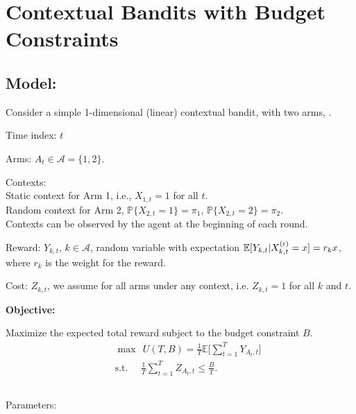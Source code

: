 \newpage

\section*{Contextual Bandits with Budget Constraints}


\subsection*{Model:}

Consider a simple 1-dimensional (linear) contextual bandit, with two arms, .

Time index: $t$

Arms: $A_t \in \mathcal{A} = \{1, 2\}$.

Contexts: \\
Static context for Arm 1, i.e., $X_{1,t} = 1$ for all $t$. \\
Random context for Arm 2, $\mathbb{P}\{X_{2,t} = 1\} = \pi_1$, $\mathbb{P}\{X_{2,t} = 2\} = \pi_2$. \\
Contexts can be observed by the agent at the beginning of each round.

Reward: $Y_{k,t}$, $k \in \mathcal{A}$, random variable with expectation $\mathbb{E}[Y_{k,t}|X^{\rm (r)}_{k,t} = x] = r_k x$, where $r_k$ is the weight for the reward.

Cost: $Z_{k,t}$, we assume  for all arms under any context, i.e. $Z_{k,t} = 1$ for all $k$ and $t$.

\textbf{Objective:}

Maximize the expected total reward subject to the budget constraint $B$.
\begin{eqnarray}
&&\max ~~U(T,B) = \frac{1}{T}\mathbb{E}\big[\sum_{t=1}^{T} Y_{A_t,t}] \nonumber \\
&&\text{s.t.}~~~~~~\frac{1}{T}\sum_{t=1}^T Z_{A_t,t} \leq \frac{B}{T}.\nonumber
\end{eqnarray}

\subsection*{}


Parameters:

